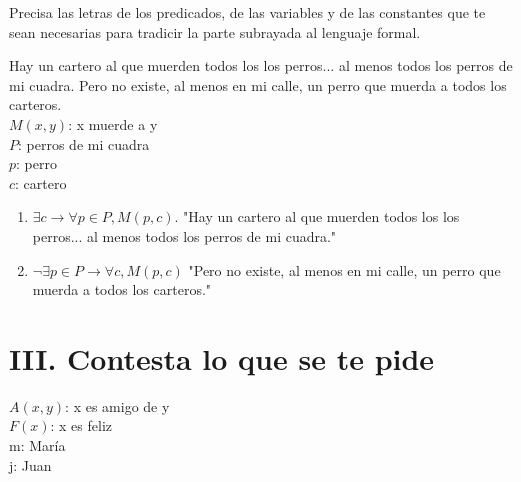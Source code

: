 \documentclass[a4paper,10pt]{article}
\begin{document}
Precisa las letras de los predicados, de las variables y de las constantes que te sean necesarias para tradicir la parte subrayada al lenguaje formal.

Hay un cartero al que muerden todos los los perros... al menos todos los perros de mi cuadra. Pero no existe, al menos en mi calle, un perro que muerda a todos los carteros.\\

\(M(x, y)\): x muerde a y\\
\(P\): perros de mi cuadra\\
\(p\): perro\\
\(c\): cartero

\begin{enumerate}
 \item \(\exists c \to \forall p \in P, M(p, c)\). "Hay un cartero al que muerden todos los los perros... al menos todos los perros de mi cuadra."
 \item \(\neg \exists p \in P \to \forall c, M(p ,c)\) "Pero no existe, al menos en mi calle, un perro que muerda a todos los carteros."
\end{enumerate}


\section{III. Contesta lo que se te pide}

\(A(x,y)\): x es amigo de y\\
\(F(x)\): x es feliz\\
m: María\\
j: Juan\\
\end{document}
